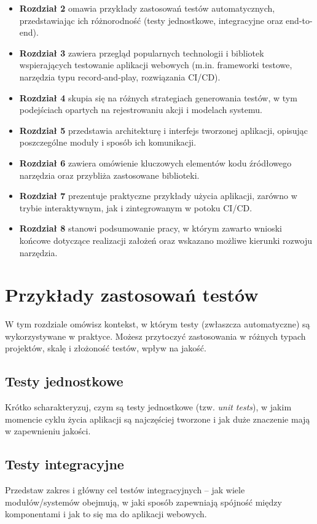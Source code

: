 \documentclass[12pt]{report}
\begin{document}
\begin{itemize}
    \item \textbf{Rozdział 2} omawia przykłady zastosowań testów automatycznych, przedstawiając ich różnorodność (testy jednostkowe, integracyjne oraz end-to-end).
    \item \textbf{Rozdział 3} zawiera przegląd popularnych technologii i bibliotek wspierających testowanie aplikacji webowych (m.in. frameworki testowe, narzędzia typu record-and-play, rozwiązania CI/CD).
    \item \textbf{Rozdział 4} skupia się na różnych strategiach generowania testów, w tym podejściach opartych na rejestrowaniu akcji i modelach systemu.
    \item \textbf{Rozdział 5} przedstawia architekturę i interfejs tworzonej aplikacji, opisując poszczególne moduły i sposób ich komunikacji.
    \item \textbf{Rozdział 6} zawiera omówienie kluczowych elementów kodu źródłowego narzędzia oraz przybliża zastosowane biblioteki.
    \item \textbf{Rozdział 7} prezentuje praktyczne przykłady użycia aplikacji, zarówno w trybie interaktywnym, jak i zintegrowanym w potoku CI/CD.
    \item \textbf{Rozdział 8} stanowi podsumowanie pracy, w którym zawarto wnioski końcowe dotyczące realizacji założeń oraz wskazano możliwe kierunki rozwoju narzędzia.
\end{itemize}

\chapter{Przykłady zastosowań testów}
{W tym rozdziale omówisz kontekst, w którym testy (zwłaszcza automatyczne) są wykorzystywane w praktyce. Możesz przytoczyć zastosowania w różnych typach projektów, skalę i złożoność testów, wpływ na jakość.}

\section{Testy jednostkowe}
{Krótko scharakteryzuj, czym są testy jednostkowe (tzw. \emph{unit tests}), w jakim momencie cyklu życia aplikacji są najczęściej tworzone i jak duże znaczenie mają w zapewnieniu jakości.}

\section{Testy integracyjne}
{Przedstaw zakres i główny cel testów integracyjnych – jak wiele modułów/systemów obejmują, w jaki sposób zapewniają spójność między komponentami i jak to się ma do aplikacji webowych.}
\end{document}
